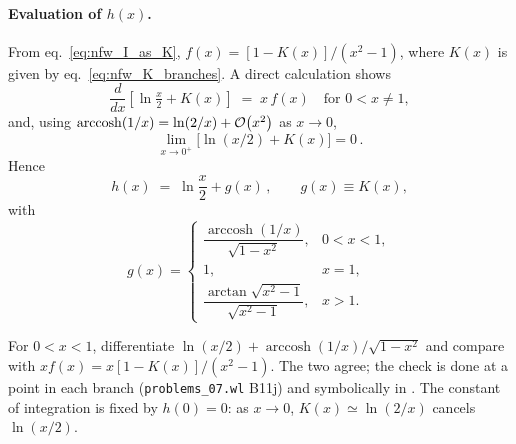 \paragraph{Evaluation of $h(x)$.}
From eq.~\eqref{eq:nfw_I_as_K},
$f(x) = [1 - K(x)]/(x^2-1)$, where $K(x)$ is given by
eq.~\eqref{eq:nfw_K_branches}.  A direct calculation shows
\begin{equation}
    \frac{d}{dx}\!\left[\ln\!\tfrac{x}{2} + K(x)\right]
    \;=\; x\,f(x)
    \quad\text{for } 0 < x \neq 1,
    \label{eq:nfw_antiderivative}
\end{equation}
and, using
$\operatorname{arccosh}(1/x) = \ln(2/x) + \mathcal{O}\!\left(x^2\right)$ as $x \to 0$,
\begin{equation*}
    \lim_{x\to 0^+}\bigl[\ln(x/2) + K(x)\bigr] = 0 \,.
\end{equation*}
Hence
\begin{equation}
    h(x) \;=\; \ln\!\frac{x}{2} + g(x) \,,
    \qquad
    g(x) \equiv K(x),
    \label{eq:nfw_h_evaluated}
\end{equation}
with
\begin{equation}
    g(x) = \begin{cases}
        \dfrac{\operatorname{arccosh}(1/x)}{\sqrt{1-x^2}}, & 0 < x < 1, \\[6pt]
        1, & x = 1, \\[4pt]
        \dfrac{\arctan\!\sqrt{x^2-1}}{\sqrt{x^2-1}}, & x > 1.
    \end{cases}
    \label{eq:nfw_g}
\end{equation}

\begin{derivation}
For $0<x<1$, differentiate $\ln(x/2)+\operatorname{arccosh}(1/x)/\sqrt{1-x^2}$ and
compare with $x f(x) = x[1-K(x)]/(x^2-1)$.  The two agree; the check is done
at a point in each branch (\texttt{problems\_07.wl} B11j) and symbolically in
.  The
constant of integration is fixed by $h(0) = 0$: as $x\to0$,
$K(x)\simeq\ln(2/x)$ cancels $\ln(x/2)$.
\end{derivation}

